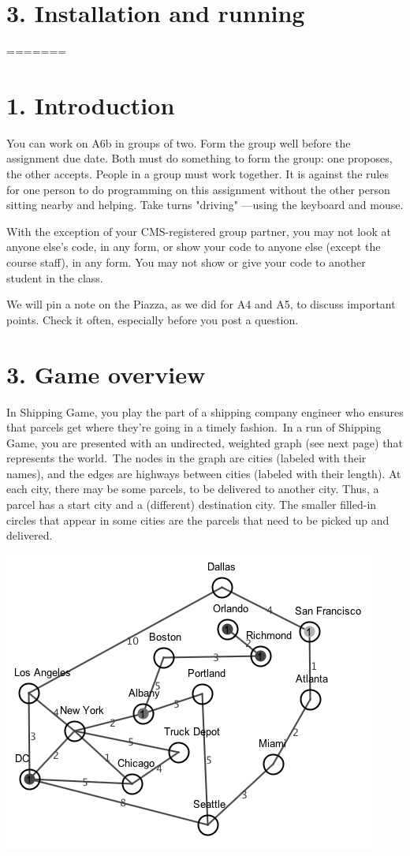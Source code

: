 \documentclass[11pt]{article}
\begin{document}
\section{3. Installation and running}
=======


\section{1. Introduction}
You can work on A6b in groups of two. Form the group well before the assignment due date. Both must do something to form the group:
one proposes, the other accepts.
People in a group must work together. It is against the rules for one person to do programming on this assignment
without the other person sitting nearby and helping. Take turns "driving" ---using the keyboard and mouse.

With the exception of your CMS-registered group partner, you may not look at anyone else's code, in any form,
or show your code to anyone else (except the course staff), in any form. You may not show or give your code to another
student in the class.

We will pin a note on the Piazza, as we did for A4 and A5, to discuss important points. Check it often, especially before you post a question.



\section{3. Game overview}
In Shipping Game, you play the part of a shipping company engineer who ensures that parcels get where they're going in a timely fashion.\ In a run of Shipping Game, you are presented with an undirected, weighted graph (see next page) that represents the world.\ The nodes in the graph are cities (labeled with their names), and the edges are highways between cities (labeled with their length). At each city, there may be some parcels, to be delivered to another city. Thus, a parcel has a start city and a (different) destination city.
The smaller filled-in circles that appear in some cities are the parcels that need to be picked up and delivered.\\
\centerline{\includegraphics[scale=0.8]{map1.png}}\\
\end{document}
